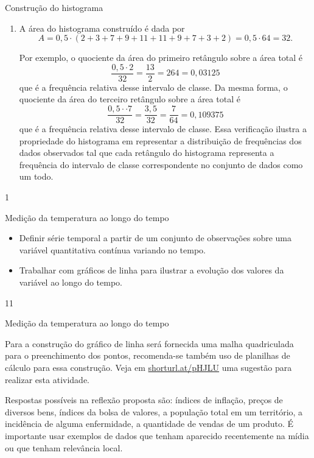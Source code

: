 {\begin{answer}{Construção do histograma}
{\begin{enumerate}
{
}

\setcounter{enumi}{3}

\item A área do histograma construído é dada por $$A=0{,}5\cdot(2+3+7+9+11+11+9+7+3+2)=0{,}5\cdot64=32.$$

Por exemplo, o quociente da área do primeiro retângulo sobre a área total é $$\displaystyle\frac{0{,}5\cdot2}{32}=\frac{13}{2}=264=0,03125$$ que é a frequência relativa desse intervalo de classe. Da mesma forma, o quociente da área do terceiro retângulo sobre a área total é $$\displaystyle\frac{0{,}5⋅\cdot7}{32}=\frac{3{,}5}{32}=\frac{7}{64}=0{,}109375$$ que é a frequência relativa desse intervalo de classe. Essa verificação ilustra a propriedade do histograma em representar a distribuição de frequências dos dados observados tal que cada retângulo do histograma representa a frequência do intervalo de classe correspondente no conjunto de dados como um todo.
\end{enumerate}
}{1}
\end{answer}
\begin{objectives}{Medição da temperatura ao longo do tempo}
{
\begin{itemize}
\item Definir série temporal a partir de um conjunto de observações sobre uma variável quantitativa contínua variando no tempo.

\item Trabalhar com gráficos de linha para ilustrar a evolução dos valores da variável ao longo do tempo.
\end{itemize}
}{1}{1}
\end{objectives}
\begin{sugestions}{Medição da temperatura ao longo do tempo}
{
Para a construção do gráfico de linha será fornecida uma malha quadriculada para o preenchimento dos pontos, recomenda-se também uso de planilhas de cálculo para essa construção. Veja em \url{shorturl.at/pHJLU} uma sugestão para realizar esta atividade.

Respostas possíveis na reflexão proposta são: índices de inflação, preços de diversos bens, índices da bolsa de valores, a população total em um território, a incidência de alguma enfermidade, a quantidade de vendas de um produto. É importante usar exemplos de dados que tenham aparecido recentemente na mídia ou que tenham relevância local.

}
\end{sugestions}}
